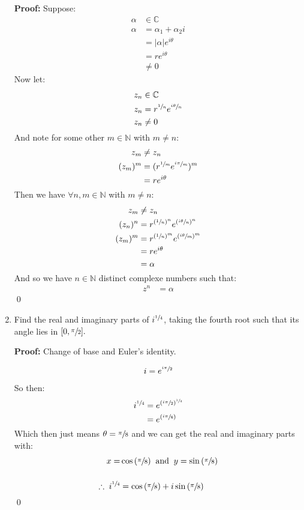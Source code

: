 \begin{enumerate}
	\textbf{Proof:}
	Suppose:
	\begin{align*}
		\alpha &\in \mathbb{C} \\
		\alpha &= \alpha_1 + \alpha_2 i \\ 
		&= |\alpha|e^{i\theta} \\
		&= r e^{i\theta} \\
		&\neq 0
	\end{align*}
	Now let:
	\begin{align*}
		z_n &\in \mathbb{C} \\
		z_n &= r^{\sfrac{1}{n}}e^{\sfrac{i\theta}{n}} \\
		z_n &\neq 0
	\end{align*}
	And note for some other $m \in \mathbb{N}$ with $m \neq n:$
	\begin{align*}
		z_m &\neq z_n \\
		(z_m)^m &= (r^{\sfrac{1}{m}}e^{\sfrac{i\pi}{m}})^m \\
		&= re^{i\theta}
	\end{align*}
	Then we have $\forall n, m \in \mathbb{N}$ with $m \neq n:$
	\begin{align*}
		z_m &\neq z_n \\
		(z_n)^n &= r^{(\sfrac{1}{n})^n} e^{(\sfrac{i\theta}{n})^n} \\
		(z_m)^m &= r^{(\sfrac{1}{n})^m} e^{(\sfrac{i\theta}{m})^m} \\
		&= re^{i\theta} \\
		&= \alpha
	\end{align*}
	And so we have $n \in \mathbb{N}$ distinct complexe numbers such that:
	\begin{align*}
		z^n &= \alpha
	\end{align*}
	\qed
	
	\item Find the real and imaginary parts of $i^{\sfrac{1}{4}}$, taking the fourth root such that its angle lies in $[0, \sfrac{\pi}{2}].$

	\textbf{Proof:}
	Change of base and Euler's identity.

	\begin{align*}
		i &= e^{\sfrac{i\pi}{2}} \\
	\end{align*}
	So then:
	\begin{align*}
		i^{\sfrac{1}{4}} &= e^{(\sfrac{i \pi}{2})^{\sfrac{1}{4}}} \\
		&= e^{(\sfrac{i \pi}{8})}
	\end{align*}
	Which then just means $\theta = \sfrac{\pi}{8}$ and we can get the real and imaginary parts with:
	\begin{align*}
		x = &\cos{(\sfrac{\pi}{8})} \;\; \text{and} \;\; y = \sin{(\sfrac{\pi}{8})} \\
		\\
		\therefore \; i^{\sfrac{1}{4}} &= \cos{(\sfrac{\pi}{8})} + i\sin{(\sfrac{\pi}{8})}
	\end{align*}
	\qed
	


\end{enumerate}
